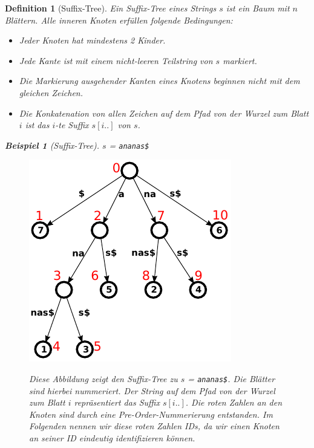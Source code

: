 \documentclass[a4paper,11pt]{scrartcl}%
\theoremstyle{change}
\theoremstyle{nonumberplain}
\theoremstyle{change}
\newtheorem{definition}[theorem]{Definition}
\theoremstyle{nonumberplain}
\theoremstyle{change}
\newtheorem{beispiel}[theorem]{Beispiel}
\theoremstyle{nonumberplain}
\begin{document}
\begin{definition}[Suffix-Tree]
		Ein Suffix-Tree eines Strings $s$ ist ein Baum mit $n$ Blättern. Alle inneren Knoten erfüllen folgende Bedingungen:
		\begin{itemize}
			\item Jeder Knoten hat mindestens 2 Kinder.
			\item Jede Kante ist mit einem nicht-leeren Teilstring von $s$ markiert.
			\item Die Markierung ausgehender Kanten eines Knotens beginnen nicht mit dem gleichen Zeichen.
			\item Die Konkatenation von allen Zeichen auf dem Pfad von der Wurzel zum Blatt $i$ ist das $i$-te Suffix $s[i..]$ von $s$.
		\end{itemize}
		\begin{beispiel}[Suffix-Tree]
			$s$ = \texttt{ananas\$}
			\begin{figure}[h]
				\centering
				  \includegraphics[scale=0.8]{./pics/ananas_suffixTree_inorder}
				  \cite{suffixtreeurl}
				  \caption{Diese Abbildung zeigt den Suffix-Tree zu $s$ = \texttt{ananas\$}. Die Blätter sind hierbei nummeriert. Der String auf dem Pfad von der Wurzel zum Blatt $i$ repräsentiert das Suffix $s[i..]$. Die roten Zahlen an den Knoten sind durch eine Pre-Order-Nummerierung entstanden. Im Folgenden nennen wir diese roten Zahlen IDs, da wir einen Knoten an seiner ID eindeutig identifizieren können. }
				  \label{fig:suffixTree}
			\end{figure}
		\end{beispiel}
		
	\end{definition}
	
\end{document}
